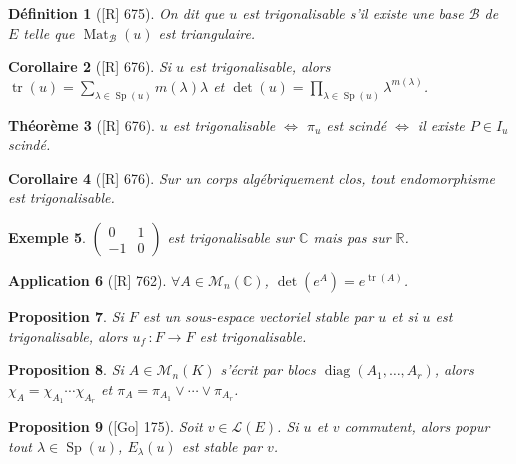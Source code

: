 \documentclass[10pt, a4paper, parskip=full, twoside, twocolumn]{report}
\newtheorem{definition}{Définition}
\newtheorem{theorem}[definition]{Théorème}
\newtheorem{proposition}[definition]{Proposition}
\newtheorem{corollary}[definition]{Corollaire}
\newtheorem{example}[definition]{Exemple}
\newtheorem{application}[definition]{Application}
\newcommand{\IC}{\mathbb{C}}
\newcommand{\IR}{\mathbb{R}}
\DeclareMathOperator{\Mat}{Mat}
\DeclareMathOperator{\diag}{diag}
\DeclareMathOperator{\tr}{tr}
\DeclareMathOperator{\Sp}{Sp}
\begin{document}
\begin{definition}[\textnormal{[R] 675}]
	On dit que $u$ est \emph{trigonalisable} s'il existe une base $\mathcal{B}$ de $E$ telle que $\Mat_{\mathcal{B}}(u)$ est triangulaire.
\end{definition}

\begin{corollary}[\textnormal{[R] 676}]
	Si $u$ est trigonalisable, alors $\tr(u) = \sum_{\lambda\in\Sp(u)} m(\lambda)\lambda$ et $\det(u) = \prod_{\lambda\in\Sp(u)} \lambda^{m(\lambda)}$.
\end{corollary}

\begin{theorem}[\textnormal{[R] 676}]
	$u$ est trigonalisable $\iff$ $\pi_u$ est scindé $\iff$ il existe $P\in I_u$ scindé.
\end{theorem}

\begin{corollary}[\textnormal{[R] 676}]
	Sur un corps algébriquement clos, tout endomorphisme est trigonalisable.
\end{corollary}

\begin{example}
	$\begin{pmatrix}
		0&1\\-1&0
	\end{pmatrix}$ est trigonalisable sur $\IC$ mais pas sur $\IR$.
\end{example}

\begin{application}[\textnormal{[R] 762}]
	$\forall A\in \mathcal{M}_n(\IC)$, $\det(e^A) = e^{\tr(A)}$.
\end{application}

\begin{proposition}
	Si $F$ est un sous-espace vectoriel stable par $u$ et si $u$ est trigonalisable, alors $u_f\,\colon F\to F$ est trigonalisable.
\end{proposition}

\begin{proposition}
	Si $A\in\mathcal{M}_n(K)$ s'écrit par blocs $\diag(A_1,\dots,A_r)$,
	alors $\chi_A = \chi_{A_1}\cdots \chi_{A_r}$ et $\pi_A = \pi_{A_1}\vee \cdots \vee \pi_{A_r}$.
\end{proposition}

\begin{proposition}[\textnormal{[Go] 175}]
	Soit $v\in \mathcal{L}(E)$. Si $u$ et $v$ commutent, alors popur tout $\lambda\in\Sp(u)$, $E_{\lambda}(u)$ est stable par $v$.
\end{proposition}
\end{document}
